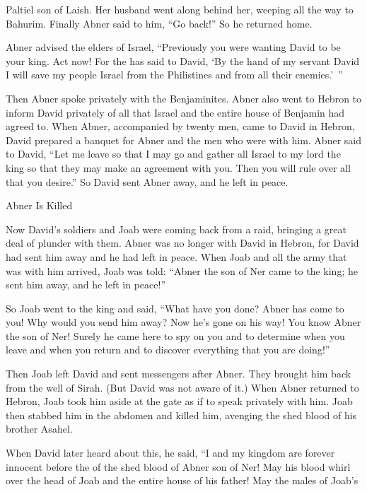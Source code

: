{Paltiel
son
of Laish.
Her husband
went
along behind
her, weeping
all the way
to Bahurim.
Finally Abner
said
to him,
“Go
back!” So he returned home.
\par }{\PP {}Abner
advised
the elders
of Israel,
“Previously you were wanting
David
to be your king.
Act
now! For
the {}
has said
to
David,
‘By the hand
of my servant
David
I will save
my people
Israel
from
the Philistines
and from
all
their enemies.’ ”
\par }{\PP {}Then
Abner
spoke
privately
with the Benjaminites.
Abner
also
went
to Hebron
to inform David
privately
of all
that
Israel
and the entire
house
of Benjamin had agreed to.
When Abner,
accompanied
by twenty
men,
came
to David
in Hebron,
David
prepared
a banquet
for Abner
and the men
who
were with him.
Abner
said
to
David,
“Let me leave
so that I may go
and gather
all
Israel
to
my lord
the king
so that they may make
an agreement
with
you. Then you will rule
over all
that
you desire.”
So David
sent
Abner
away, and he left in peace.
\par }{\SH Abner Is Killed
\par }{\PP {}Now
David’s
soldiers
and Joab
were coming
back from a raid,
bringing
a great
deal of plunder
with
them. Abner
was no
longer with
David
in Hebron,
for
David had sent
him away and he had left
in peace.
When Joab
and all
the army
that
was with
him arrived,
Joab
was told: “Abner
the son
of Ner
came
to
the king;
he sent
him away, and he left
in peace!”
\par }{\PP {}So Joab
went
to
the king
and said,
“What
have you done? Abner
has
come
to
you! Why
would you send
him
away? Now he’s gone
on his way!
You know
Abner
the son
of Ner! Surely
he came
here to spy on
you and to determine
when you leave
and when you return
and to discover
everything
that
you
are doing!”
\par }{\PP {}Then Joab
left
David
and sent
messengers
after
Abner.
They brought him back
from the well
of Sirah.
(But David
was not
aware of it.)
When Abner
returned
to Hebron,
Joab
took him aside
at the gate
as if to speak
privately
with
him. Joab then stabbed
him in the abdomen
and killed
him, avenging the shed blood
of his brother
Asahel.
\par }{\PP {}When David
later
heard
about this,
he said,
“I
and my kingdom
are forever
innocent
before the
{}
of the shed blood
of Abner
son
of Ner!
May his blood whirl
over
the head
of Joab
and the entire
house
of his father! May the males of Joab’s
}
